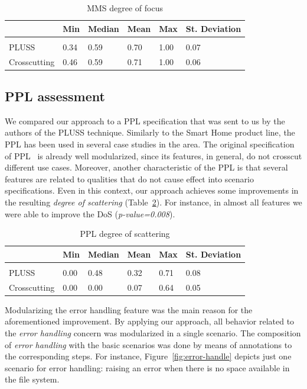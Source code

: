 \documentclass{acm_proc_article-sp}
\begin{document}
\begin{table}[htb] \centering
\caption{MMS degree of focus}
\label{tab:mms-dof}
\begin{small}
\begin{tabular}{llllll} \hline
					& Min 	& Median 	& Mean 	& Max 	& St. Deviation \\ \hline \\
	PLUSS			& 0.34	& 0.59		& 0.70	& 1.00	& 0.07			\\
	Crosscutting	& 0.46  & 0.59   	& 0.71 	& 1.00 	& 0.06			\\ \hline	
\end{tabular}
\end{small}
\end{table}

\subsection{PPL assessment}

We compared our approach to a PPL specification that was sent to us by the
authors of the PLUSS technique. Similarly to the Smart Home product line, the PPL has been used in several case
studies in the area. The original specification of PPL~\cite{PPL:2008} is already well
modularized, since its features, in general, do not crosscut different
use cases. Moreover, another characteristic of the PPL is that several features
are related to qualities that do not cause effect into scenario specifications.
Even in this context, our approach achieves some improvements in the
resulting \emph{degree of scattering} (Table~\ref{tab:ppl-dos}). For instance,
in almost all features we were able to improve the DoS (\emph{p-value=0.008}).


\begin{table}[htb] \centering
\caption{PPL degree of scattering}
\label{tab:ppl-dos}
\begin{small}
\begin{tabular}{llllll} \hline
					& Min 	& Median 	& Mean 	& Max 	& St. Deviation \\ \hline \\
	PLUSS			& 0.00	& 0.48		& 0.32	& 0.71	& 0.08			\\
	Crosscutting	& 0.00  & 0.00   	& 0.07 	& 0.64 	& 0.05			\\ \hline	
\end{tabular}
\end{small}
\end{table}


Modularizing the error handling feature was the main reason for the
aforementioned improvement. By applying our approach, all behavior related to
the \emph{error handling} concern was modularized in a single scenario. The
composition of \emph{error handling} with the basic scenarios was done by means
of annotations to the corresponding steps. For instance,
Figure~\ref{fig:error-handle} depicts just one scenario for error handling:
raising  an error when there is no space available in the file system.
\end{document}
